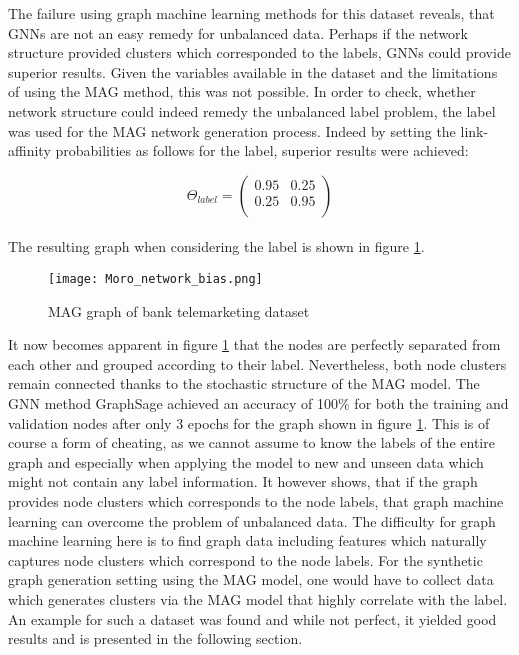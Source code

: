   \noindent The failure using graph machine learning methods for this dataset
  reveals, that GNNs are not an easy remedy for unbalanced data. Perhaps if the
  network structure provided clusters which corresponded to the labels, GNNs
  could provide superior results. Given the variables available in the dataset
  and the limitations of using the MAG method, this was not possible. In order
  to check, whether network structure could indeed remedy the unbalanced label
  problem, the label was used for the MAG network generation process. Indeed by
  setting the link-affinity probabilities as follows for the label, superior
  results were achieved:

  \[ \Theta_{label} = 
	\begin{pmatrix}
        0.95 & 0.25 \\
		0.25 & 0.95 \\
	\end{pmatrix}
	\] \\
  
  \noindent The resulting graph when considering the label is shown in figure
  \ref{fig:Moro_bias}.

  \begin{figure}[h]
		\centering
		\texttt{[image: Moro\_network\_bias.png]}
		\caption{MAG graph of bank telemarketing dataset}
        \label{fig:Moro_bias}
  \end{figure}

  \noindent It now becomes apparent in figure \ref{fig:Moro_bias} that the
  nodes are perfectly separated from each other and grouped according to their
  label. Nevertheless, both node clusters remain connected thanks to the
  stochastic structure of the MAG model. The GNN method GraphSage achieved an 
  accuracy of 100\% for both the training and validation nodes after only 3 
  epochs for the graph shown in figure \ref{fig:Moro_bias}. This is of course a 
  form of cheating, as we cannot assume to know the labels of the entire graph 
  and especially when applying the model to new and unseen data which might not 
  contain any label information. It however shows, that if the graph provides 
  node clusters which corresponds to the node labels, that graph machine 
  learning can overcome the problem of unbalanced data. The difficulty for 
  graph machine learning here is to find graph data including features which 
  naturally captures node clusters which correspond to the node labels. For the 
  synthetic graph generation setting using the MAG model, one would have to
  collect data which generates clusters via the MAG model that highly correlate
  with the label. An example for such a dataset was found and while not
  perfect, it yielded good results and is presented in the following section. 

